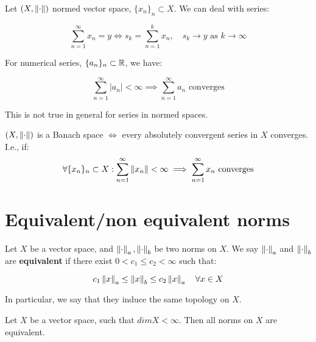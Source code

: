 \begin{fremark}
    Let $(X, \left\|\cdot\right\|)$ normed vector space, $\{x_n\}_n \subset X$. We can deal 
    with series:
    
    $$\sum_{n=1}^{\infty} x_n = y \iff s_k = \sum_{n=1}^k x_n, \quad s_k \to y \text{ as } k \to \infty$$

    For numerical series, $\{a_n\}_n \subset \mathbb{R}$, we have:

    $$\sum_{n=1}^{\infty} |a_n| < \infty \implies \sum_{n=1}^{\infty} a_n \text{ converges}$$

    This is not true in general for series in normed spaces.
\end{fremark}

\vspace{1em}

\begin{fproposition}
    $(X, \left\|\cdot\right\|)$ is a Banach space $\iff$ every absolutely convergent series in $X$ converges.
    I.e., if:
    $$\forall \{x_n\}_n \subset X: \sum_{n=1}^{\infty} \left\|x_n\right\| < \infty \implies \sum_{n=1}^{\infty} x_n \text{ converges}$$
\end{fproposition}

\section{Equivalent/non equivalent norms}

\begin{fdefinition}
    Let $X$ be a vector space, and $\left\|\cdot\right\|_a, \left\|\cdot\right\|_b$ be two norms on $X$. We say
    $\left\|\cdot\right\|_a$ and $\left\|\cdot\right\|_b$ are \textbf{equivalent} if there exist $0 < c_1 \leq c_2 < \infty$
    such that:

    $$c_1 \left\|x\right\|_a \leq \left\|x\right\|_b \leq c_2 \left\|x\right\|_a \quad \forall x \in X$$

    In particular, we say that they induce the same topology on $X$.
\end{fdefinition}

\begin{ftheorem}
    Let $X$ be a vector space, such that $dim{X} < \infty$. Then all norms on $X$ are equivalent.
\end{ftheorem}

